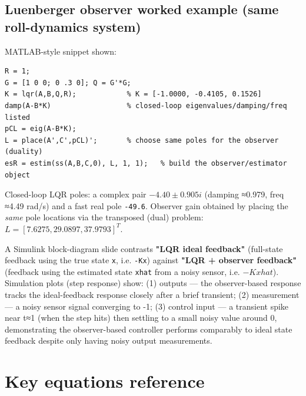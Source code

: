 \documentclass[11pt]{article}
\begin{document}
\subsection{Luenberger observer worked example (same roll-dynamics system)}
MATLAB-style snippet shown:
\scriptsize
\begin{verbatim}
R = 1;
G = [1 0 0; 0 .3 0]; Q = G'*G;
K = lqr(A,B,Q,R);            % K = [-1.0000, -0.4105, 0.1526]
damp(A-B*K)                  % closed-loop eigenvalues/damping/freq listed
pCL = eig(A-B*K);
L = place(A',C',pCL)';       % choose same poles for the observer (duality)
esR = estim(ss(A,B,C,0), L, 1, 1);   % build the observer/estimator object
\end{verbatim}
\normalsize
Closed-loop LQR poles: a complex pair $-4.40 ± 0.905i$ (damping ≈0.979, freq ≈4.49 rad/s) and a fast real pole \texttt{-49.6}. Observer gain obtained by placing the \textit{same} pole locations via the transposed (dual) problem: $L = [7.6275, 29.0897, 37.9793]^T$.

A Simulink block-diagram slide contrasts \textbf{"LQR ideal feedback"} (full-state feedback using the true state \texttt{x}, i.e. \texttt{-Kx}) against \textbf{"LQR + observer feedback"} (feedback using the estimated state \texttt{xhat} from a noisy sensor, i.e. $-K xhat$). Simulation plots (step response) show: (1) outputs — the observer-based response tracks the ideal-feedback response closely after a brief transient; (2) measurement — a noisy sensor signal converging to -1; (3) control input — a transient spike near t≈1 (when the step hits) then settling to a small noisy value around 0, demonstrating the observer-based controller performs comparably to ideal state feedback despite only having noisy output measurements.

\section{Key equations reference}
\end{document}

